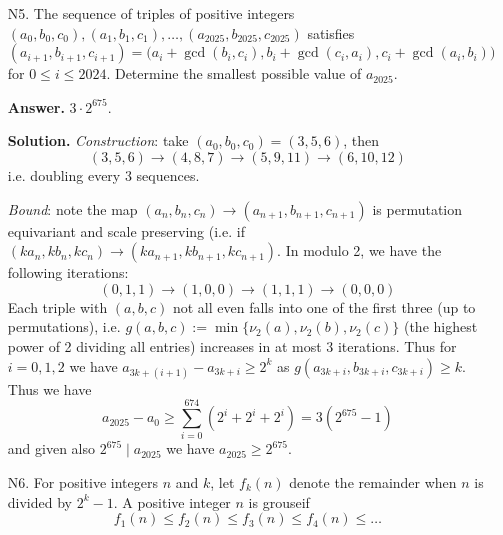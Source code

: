 \documentclass[11pt,a4paper]{article}
\begin{document}
\begin{enumerate}
\begin{proof}
\begin{itemize}
    		\item By injectivity again we have $d_0\mid f(n)$ whenever $d_0\mid n$. 
    		
    		\item 
    		Consider $n = 2d_0, 3d_0$ simultaneously, however, $f(n)=-kd_0$. Given also that $f(d_0)=0$, we have $f(2d_0)=f(3d_0)=-d_0$, contradicting injectivity. 
    	\end{itemize}
    	\end{proof}
        To see why this claim uniquely determines $f$, we construct each $f(1), f(2), \cdots$ as follows: 
        for each $n$, assume that $f(d)=-d$ for all $d=1, 2, \cdots, n - 1$, 
        the injectivity claim implies that the only number smaller than $-(n-1)$ and is a divior of $n$ is $-n$. 
    	
    	\item [N5.]
    	The sequence of triples of positive integers $(a_0,b_0,c_0),(a_1,b_1,c_1),\ldots,(a_{2025},b_{2025},c_{2025})$ satisfies
    	$$(a_{i+1},b_{i+1},c_{i+1})=\big(a_{i}+ \gcd\left(b_{i},c_{i}\right),b_{i}+ \gcd\left(c_{i},a_{i}\right),c_{i}+ \gcd\left(a_{i},b_{i}\right)\big)$$for $0 \leqslant i \leqslant 2024.$ Determine the smallest possible value of $a_{2025}.$
    	
    	\textbf{Answer.} $3\cdot 2^{675}$. 
    	
    	\textbf{Solution.}
    	\textit{Construction}: take $(a_0, b_0, c_0)=(3, 5, 6)$, then 
    	\[
    	(3, 5, 6) \to (4, 8, 7) \to (5, 9, 11) \to (6, 10, 12)
    	\]
    	i.e. doubling every 3 sequences. 
    	
    	\textit{Bound}: note the map $(a_n, b_n, c_n) \to (a_{n+1}, b_{n+1}, c_{n+1})$ is permutation equivariant and scale preserving 
    	(i.e. if $(ka_n, kb_n, kc_n)\to (ka_{n+1}, kb_{n+1}, kc_{n+1})$. 
    	In modulo 2, we have the following iterations: 
    	\[
    	(0, 1, 1) \to (1, 0, 0) \to (1, 1, 1) \to (0, 0, 0)
    	\]
    	Each triple with $(a, b, c)$ not all even falls into one of the first three (up to permutations), i.e. $g(a, b, c) :=\min \{\nu_2(a), \nu_2(b), \nu_2(c)\}$ (the highest power of 2 dividing all entries) increases in at most 3 iterations. 
    	Thus for $i=0, 1, 2$ we have $a_{3k+(i+1)}-a_{3k+i}\ge 2^k$ as $g(a_{3k+i}, b_{3k+i}, c_{3k+i})\ge k$. 
    	Thus we have 
    	\[
    	a_{2025}-a_0\ge \sum_{i=0}^{674} (2^i+2^i+2^i)
    	=3(2^{675}-1)
    	\]
    	and given also $2^{675}\mid a_{2025}$ we have $a_{2025}\ge 2^{675}$. 
    	
    	
    	\item [N6.]
    	For positive integers $n$ and $k$, let $f_{k}(n)$ denote the remainder when $n$ is divided by $2^{k}-1.$ A positive integer $n$ is grouseif
    	\[ f_{1}(n)\le f_{2}(n)\le f_{3}(n)\le f_{4}(n)\le\dots \]
    	

\end{enumerate}
\end{document}

